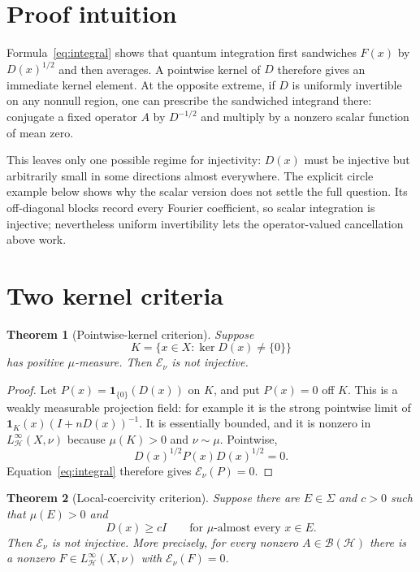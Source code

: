 \documentclass[11pt]{article}
\newtheorem{theorem}{Theorem}[section]
\newcommand{\B}{\mathcal B}
\newcommand{\E}{\mathcal E}
\begin{document}
\section{Proof intuition}

Formula~\eqref{eq:integral} shows that quantum integration first sandwiches
$F(x)$ by $D(x)^{1/2}$ and then averages.  A pointwise kernel of $D$ therefore
gives an immediate kernel element.  At the opposite extreme, if $D$ is
uniformly invertible on any nonnull region, one can prescribe the sandwiched
integrand there: conjugate a fixed operator $A$ by $D^{-1/2}$ and multiply by
a nonzero scalar function of mean zero.

This leaves only one possible regime for injectivity: $D(x)$ must be
injective but arbitrarily small in some directions almost everywhere.  The
explicit circle example below shows why the scalar version does not settle
the full question.  Its off-diagonal blocks record every Fourier coefficient,
so scalar integration is injective; nevertheless uniform invertibility lets
the operator-valued cancellation above work.

\section{Two kernel criteria}

\begin{theorem}[Pointwise-kernel criterion]\label{thm:kernel}
Suppose
\[
 K=\{x\in X:\ker D(x)\ne\{0\}\}
\]
has positive $\mu$-measure.  Then $\E_\nu$ is not injective.
\end{theorem}

\begin{proof}
Let $P(x)=\mathbf 1_{\{0\}}(D(x))$ on $K$, and put $P(x)=0$ off $K$.
This is a weakly measurable projection field: for example it is the strong
pointwise limit of $\mathbf 1_K(x)(I+nD(x))^{-1}$.  It is essentially bounded,
and it is nonzero in $L^\infty_{\mathcal H}(X,\nu)$ because $\mu(K)>0$ and
$\nu\sim\mu$.  Pointwise,
\[
 D(x)^{1/2}P(x)D(x)^{1/2}=0.
\]
Equation~\eqref{eq:integral} therefore gives $\E_\nu(P)=0$.
\end{proof}

\begin{theorem}[Local-coercivity criterion]\label{thm:coercive}
Suppose there are $E\in\Sigma$ and $c>0$ such that $\mu(E)>0$ and
\[
 D(x)\ge cI\qquad\text{for $\mu$-almost every }x\in E.
\]
Then $\E_\nu$ is not injective.  More precisely, for every nonzero
$A\in\B(\mathcal H)$ there is a nonzero $F\in
L^\infty_{\mathcal H}(X,\nu)$ with $\E_\nu(F)=0$.
\end{theorem}
\end{document}
